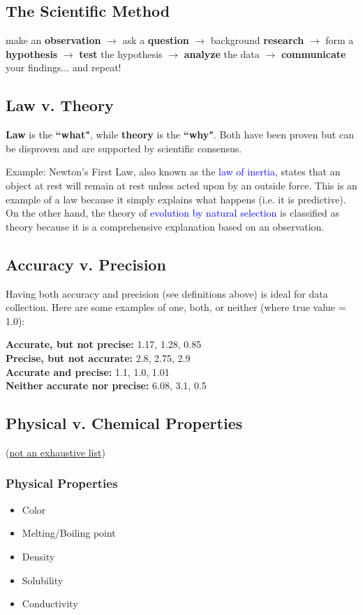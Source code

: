 \documentclass[a4paper, 12pt]{article}
\begin{document}
\subsection{The Scientific Method}
make an \textbf{observation} $\xrightarrow{}$ ask a \textbf{question} $\xrightarrow{}$ background \textbf{research} $\xrightarrow{}$ form a \textbf{hypothesis} $\xrightarrow{}$ \textbf{test} the hypothesis $\xrightarrow{}$ \textbf{analyze} the data $\xrightarrow{}$ \textbf{communicate} your findings... and repeat!

\subsection{Law v. Theory}
\textbf{Law} is the \textbf{``what"}, while \textbf{theory} is the \textbf{``why"}. Both have been proven but can be disproven and are supported by scientific consensus.  

Example: Newton's First Law, also known as the \textcolor{blue}{law of inertia}, states that an object at rest will remain at rest unless acted upon by an outside force. This is an example of a law because it simply explains what happens (i.e. it is predictive). On the other hand, the theory of \textcolor{blue}{evolution by natural selection} is classified as theory because it is a comprehensive explanation based on an observation.

\subsection{Accuracy v. Precision}
Having both accuracy and precision (see definitions above) is ideal for data collection. Here are some examples of one, both, or neither (where true value = 1.0): 

\textbf{Accurate, but not precise:} 1.17, 1.28, 0.85
\\
\textbf{Precise, but not accurate:} 2.8, 2.75, 2.9
\\
\textbf{Accurate and precise:} 1.1, 1.0, 1.01
\\
\textbf{Neither accurate nor precise:} 6.08, 3.1, 0.5


\subsection{Physical v. Chemical Properties}
(\underline{not an exhaustive list})

\subsubsection{Physical Properties}
\begin{itemize}[leftmargin=*, nosep]
    \item Color
    \item Melting/Boiling point
    \item Density
    \item Solubility
    \item Conductivity
\end{itemize}
\end{document}
